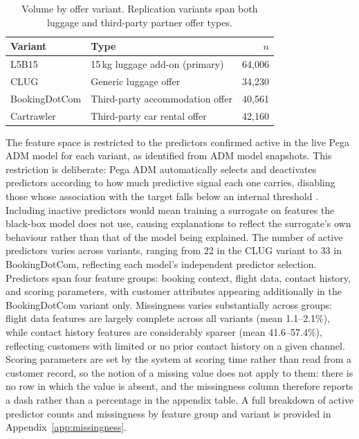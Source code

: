 \documentclass[oneside]{memoir} %
\begin{document}
\begin{table}[ht]
\caption{Volume by offer variant. Replication variants span both luggage and third-party
partner offer types.}
\label{tab:variants}
\centering
\begin{tabular}{llr}
\toprule
Variant & Type & $n$ \\
\midrule
L5B15 & 15\,kg luggage add-on (primary) & 64,006 \\
CLUG & Generic luggage offer & 34,230 \\
BookingDotCom & Third-party accommodation offer & 40,561 \\
Cartrawler & Third-party car rental offer & 42,160 \\
\bottomrule
\end{tabular}
\end{table}

The feature space is restricted to the predictors confirmed active in the live Pega ADM model for each variant, as identified from ADM model snapshots. This restriction is deliberate: Pega ADM automatically selects and deactivates predictors according to how much predictive signal each one carries, disabling those whose association with the target falls below an internal threshold \parencite{pegasystems_predictors_2020}. Including inactive predictors would mean training a surrogate on features the black-box model does not use, causing explanations to reflect the surrogate's own behaviour rather than that of the model being explained. The number of active predictors varies across variants, ranging from 22 in the CLUG variant to 33 in BookingDotCom, reflecting each model's independent predictor selection. Predictors span four feature groups: booking context, flight data, contact history, and scoring parameters, with customer attributes appearing additionally in the BookingDotCom variant only. Missingness varies substantially across groups: flight data features are largely complete across all variants (mean 1.1--2.1\%), while contact history features are considerably sparser (mean 41.6--57.4\%), reflecting customers with limited or no prior contact history on a given channel. Scoring parameters are set by the system at scoring time rather than read from a customer record, so the notion of a missing value does not apply to them: there is no row in which the value is absent, and the missingness column therefore reports a dash rather than a percentage in the appendix table. A full breakdown of active predictor counts and missingness by feature group and variant is provided in Appendix~\ref{app:missingness}.
\end{document}
